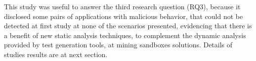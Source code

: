 This study was useful to answer the third research question (RQ3), because it disclosed some pairs of applications with malicious behavior, that could not be detected at first study at none of the scenarios presented, evidencing that there is a benefit of new static analysis techniques, to complement the dynamic analysis provided by test generation tools, at mining sandboxes solutions. Details of studies results are at next section.





